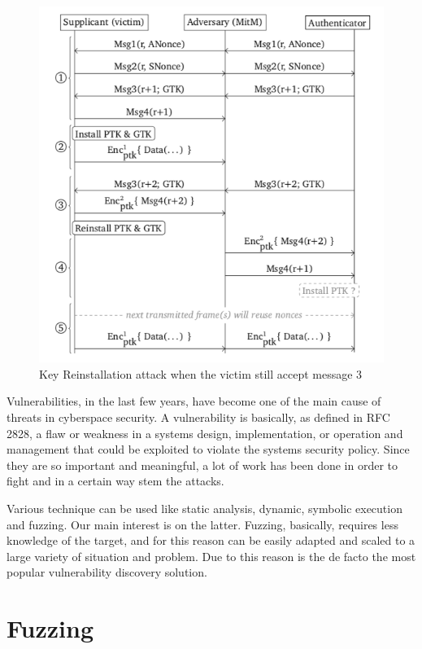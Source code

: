\begin{figure}[tbh]
  \centering
  \includegraphics[width=0.8\linewidth]{images/intro/mitm.png}
  \caption[Key Reinstallation attack]{Key Reinstallation attack when the victim still accept message 3}
  \label{fig:mitm}
\end{figure}




Vulnerabilities, in the last few years, have become one of the main cause of threats in cyberspace security. 
A vulnerability is basically, as defined in RFC 2828, a flaw or weakness in a systems design, implementation, 
or operation and management that could be exploited to violate the systems security policy. 
Since they are so important and meaningful, a lot of work has been done in order to fight and in a certain way stem the attacks.

Various technique can be used like static analysis, dynamic, symbolic execution and fuzzing.
Our main interest is on the latter. Fuzzing, basically, requires less knowledge of the target, 
and for this reason can be easily adapted and scaled to a large variety of situation and problem. 
Due to this reason is the de facto the most popular vulnerability discovery solution.


\section{Fuzzing} 

